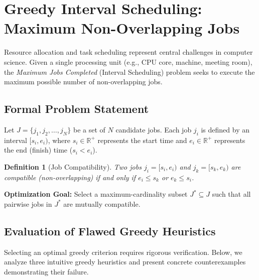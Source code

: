 \documentclass[10pt,journal,compsoc,onecolumn]{IEEEtran}
\newtheorem{definition}[theorem]{Definition}
\begin{document}
\section{Greedy Interval Scheduling: Maximum Non-Overlapping Jobs}
\label{sec:interval-scheduling}

Resource allocation and task scheduling represent central challenges in computer science. Given a single processing unit (e.g., CPU core, machine, meeting room), the \emph{Maximum Jobs Completed} (Interval Scheduling) problem seeks to execute the maximum possible number of non-overlapping jobs.

\subsection{Formal Problem Statement}

Let $J = \{j_1, j_2, \dots, j_N\}$ be a set of $N$ candidate jobs. Each job $j_i$ is defined by an interval $[s_i, e_i)$, where $s_i \in \mathbb{R}^+$ represents the start time and $e_i \in \mathbb{R}^+$ represents the end (finish) time ($s_i < e_i$).

\begin{definition}[Job Compatibility]
Two jobs $j_i = [s_i, e_i)$ and $j_k = [s_k, e_k)$ are compatible (non-overlapping) if and only if $e_i \le s_k$ or $e_k \le s_i$.
\end{definition}

\textbf{Optimization Goal:} Select a maximum-cardinality subset $J^* \subseteq J$ such that all pairwise jobs in $J^*$ are mutually compatible.

\subsection{Evaluation of Flawed Greedy Heuristics}

Selecting an optimal greedy criterion requires rigorous verification. Below, we analyze three intuitive greedy heuristics and present concrete counterexamples demonstrating their failure.
\end{document}
